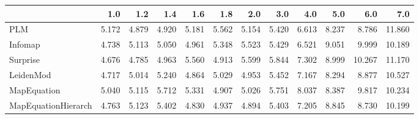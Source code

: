 \begin{tabular}{lrrrrrrrrrrr}
\toprule
{} &   1.0 &   1.2 &   1.4 &   1.6 &   1.8 &   2.0 &   3.0 &   4.0 &   5.0 &    6.0 &    7.0 \\
\midrule
PLM                 & 5.172 & 4.879 & 4.920 & 5.181 & 5.562 & 5.154 & 5.420 & 6.613 & 8.237 &  8.786 & 11.860 \\
Infomap             & 4.738 & 5.113 & 5.050 & 4.961 & 5.348 & 5.523 & 5.429 & 6.521 & 9.051 &  9.999 & 10.189 \\
Surprise            & 4.676 & 4.785 & 4.963 & 5.560 & 4.913 & 5.599 & 5.844 & 7.302 & 8.999 & 10.267 & 11.170 \\
LeidenMod           & 4.717 & 5.014 & 5.240 & 4.864 & 5.029 & 4.953 & 5.452 & 7.167 & 8.294 &  8.877 & 10.527 \\
MapEquation         & 5.040 & 5.115 & 5.712 & 5.331 & 4.907 & 5.026 & 5.751 & 8.037 & 8.387 &  9.817 & 10.234 \\
MapEquationHierarch & 4.763 & 5.123 & 5.402 & 4.830 & 4.937 & 4.894 & 5.403 & 7.205 & 8.845 &  8.730 & 10.199 \\
\bottomrule
\end{tabular}
